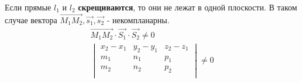 Если прямые $l_1$ и $l_2$ \textbf{скрещиваются}, то они не лежат в одной плоскости.
В таком случае вектора $\overrightarrow{M_1M_2}, \vec{s_1}, \vec{s_2}$ - некомпланарны.
\begin{gather*}
  \overrightarrow{M_1M_2} \cdot \vec{S_1} \cdot \vec{S_2} \neq 0 \\
  \begin{vmatrix}
    x_2 - x_1 & y_2 - y_1 & z_2 - z_1 \\
    m_1 & n_1 & p_1 \\
    m_2 & n_2 & p_2 \\
  \end{vmatrix} \neq 0
\end{gather*}

